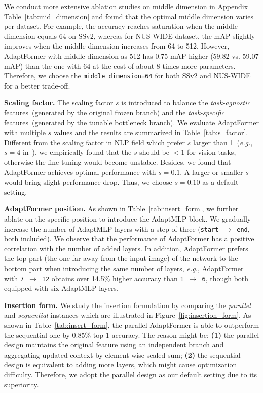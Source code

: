 We conduct more extensive ablation studies on middle dimension in Appendix Table~\ref{tab:mid_dimension} and found that the optimal middle dimension varies per dataset. For example, the accuracy reaches saturation when the middle dimension equals 64 on SSv2, whereas for NUS-WIDE dataset, the mAP slightly improves when the middle dimension increases from 64 to 512. However, AdaptFormer with middle dimension as 512 has 0.75 mAP higher (59.82 vs. 59.07 mAP) than the one with 64 at the cost of about 8 times more parameters. Therefore, we choose the \texttt{middle dimension=64} for both SSv2 and NUS-WIDE for a better trade-off.

\textbf{Scaling factor.} The scaling factor $s$ is introduced to balance the \textit{task-agnostic} features~(generated by the original frozen branch) and the \textit{task-specific} features~(generated by the tunable bottleneck branch). We evaluate AdaptFormer with multiple $s$ values and the results are summarized in Table~\ref{tab:s_factor}. Different from the scaling factor in NLP field which prefer $s$ larger than 1~(\emph{e.g.}, $s=4$ in~\cite{he2022towards}), we empirically found that the $s$ should be $<1$ for vision tasks, otherwise the fine-tuning would become unstable. Besides, we found that AdaptFormer achieves optimal performance with $s=0.1$. A larger or smaller $s$ would bring slight performance drop. Thus, we choose $s=0.10$ as a default setting. 

\textbf{AdaptFormer position.} As shown in Table~\ref{tab:insert_form}, we further ablate on the specific position to introduce the AdaptMLP block. We gradually increase the number of AdaptMLP layers with a step of three (\texttt{start}~$\rightarrow$~\texttt{end}, both included). We observe that the performance of AdaptFormer has a positive correlation with the number of added layers. In addition, AdaptFormer prefers the top part (the one far away from the input image) of the network to the bottom part when introducing the same number of layers, \emph{e.g.}, AdaptFormer with \texttt{7}~$\rightarrow$~\texttt{12} obtains over 14.5\% higher accuracy than \texttt{1}~$\rightarrow$~\texttt{6}, though both equipped with six AdaptMLP layers. 

\textbf{Insertion form.} We study the insertion formulation by comparing the \emph{parallel} and \emph{sequential} instances which are illustrated in Figure~\ref{fig:insertion_form}. As shown in Table~\ref{tab:insert_form}, the parallel AdaptFormer is able to outperform the sequential one by 0.85\% top-1 accuracy. The reason might be: \textbf{(1)} the parallel design maintains the original feature using an independent branch and aggregating updated context by element-wise scaled sum; \textbf{(2)} the sequential design is equivalent to adding more layers, which might cause optimization difficulty. Therefore, we adopt the parallel design as our default setting due to its superiority. 

